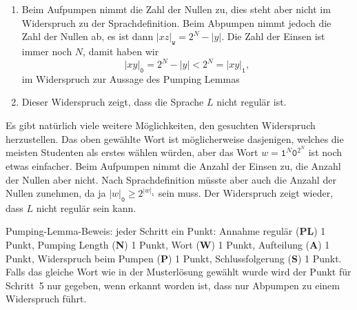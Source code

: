 \begin{loesung}
\begin{enumerate}
\begin{center}
\begin{tikzpicture}[>=latex,thick,scale=0.5]
\end{tikzpicture}
\end{center}
\item Beim Aufpumpen nimmt die Zahl der Nullen zu, dies steht aber nicht
im Widerspruch zu der Sprachdefinition.
Beim Abpumpen nimmt jedoch die Zahl der Nullen ab, es ist dann
$|xz|_{\texttt{w}}=2^N-|y|$.
Die Zahl der Einsen ist immer noch $N$, damit haben wir
\[
|xy|_{\texttt{0}} 
=
2^N-|y|
<
2^N
=
|xy|_{\texttt{1}},
\]
im Widerspruch zur Aussage des Pumping Lemmas
\item 
Dieser Widerspruch zeigt, dass die Sprache $L$ nicht regulär ist.
\qedhere
\end{enumerate}
Es gibt natürlich viele weitere Möglichkeiten, den gesuchten Widerspruch
herzustellen. 
Das oben gewählte Wort ist möglicherweise dasjenigen, welches die meisten
Studenten als erstes wählen würden, aber das Wort
$w=\texttt{1}^N\texttt{0}^{2^N}$ ist noch etwas einfacher.
Beim Aufpumpen nimmt die Anzahl der Einsen zu, die Anzahl der Nullen aber
nicht.
Nach Sprachdefinition müsste aber auch die Anzahl der Nullen zunehmen,
da ja $|w|_{\texttt{0}} \ge 2^{|w|_\texttt{1}}$ sein muss.
Der Widerspruch zeigt wieder, dass $L$ nicht regulär sein kann.
\end{loesung}

\begin{bewertung}
Pumping-Lemma-Beweis: jeder Schritt ein Punkt:
Annahme regulär ({\bf PL}) 1 Punkt,
Pumping Length ({\bf N}) 1 Punkt,
Wort ({\bf W}) 1 Punkt,
Aufteilung ({\bf A}) 1 Punkt,
Widerspruch beim Pumpen ({\bf P}) 1 Punkt,
Schlussfolgerung ({\bf S}) 1 Punkt.
Falls das gleiche Wort wie in der Musterlösung gewählt wurde wird
der Punkt für Schritt~5 nur gegeben, wenn erkannt worden ist, dass
nur Abpumpen zu einem Widerspruch führt.
\end{bewertung}
